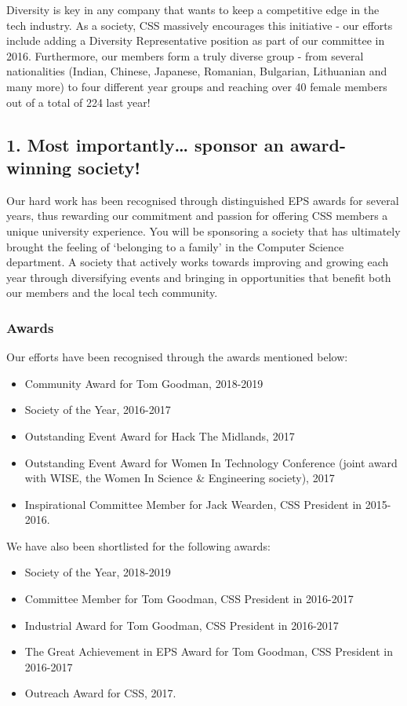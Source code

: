 \documentclass{article}
\begin{document}
Diversity is key in any company that wants to keep a competitive edge in the tech industry. As a society, CSS massively encourages this initiative - our efforts include adding a Diversity Representative position as part of our committee in 2016. 
Furthermore, our members form a truly diverse group - from several nationalities (Indian, Chinese, Japanese, Romanian, Bulgarian, Lithuanian and many more) to four different year groups and reaching over 40 female members out of a total of 224 last year! 

\subsection*{1. Most importantly… sponsor an award-winning society!}

Our hard work has been recognised through distinguished EPS awards for several years, thus rewarding our commitment and passion for offering CSS members a unique university experience. 
You will be sponsoring a society that has ultimately brought the feeling of ‘belonging to a family’ in the Computer Science department.
A society that actively works towards improving and growing each year through diversifying events and bringing in opportunities that benefit both our members and the local tech community.

\subsubsection*{Awards}

\noindent Our efforts have been recognised through the awards mentioned below:

\begin{itemize}
  \item Community Award for Tom Goodman, 2018-2019
  \item Society of the Year, 2016-2017
  \item Outstanding Event Award for Hack The Midlands, 2017
  \item Outstanding Event Award for Women In Technology Conference (joint award with WISE, the Women In Science \& Engineering society), 2017
  \item Inspirational Committee Member for Jack Wearden, CSS President in 2015-2016.
\end{itemize}

\medskip

\noindent We have also been shortlisted for the following awards:
\begin{itemize}
  \item Society of the Year, 2018-2019
  \item Committee Member for Tom Goodman, CSS President in 2016-2017
  \item Industrial Award for Tom Goodman, CSS President in 2016-2017
  \item The Great Achievement in EPS Award for Tom Goodman, CSS President in 2016-2017
  \item Outreach Award for CSS, 2017.
\end{itemize}
\end{document}
